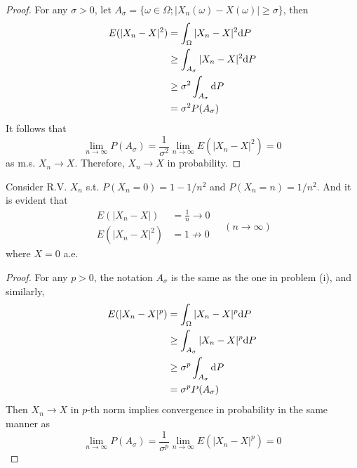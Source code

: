\documentclass{homework}
\begin{document}
    \problem
    \begin{subproblem}
        \item
        \begin{proof}
            For any $\sigma>0$, let
            $A_\sigma=\{\omega\in\Omega;|X_n(\omega)-X(\omega)|\geq\sigma\}$,
            then
            \[\begin{aligned}
                E(|X_n-X|^2)&=\int_\Omega|X_n-X|^2\mathrm d P\\
                &\geq\int_{A_\sigma}|X_n-X|^2\mathrm d P\\
                &\geq \sigma^2\int_{A_\sigma}\mathrm d P\\
                &=\sigma^2P(A_\sigma)
            \end{aligned}\]
            It follows that
            \[\lim_{n\to\infty}P(A_\sigma)
            =\frac{1}{\sigma^2}\lim_{n\to\infty}E(|X_n-X|^2)
            =0\]
            as m.s. $X_n\to X$. Therefore, $X_n\to X$ in probability.
        \end{proof}

        \item
        Consider R.V. $X_n$ s.t. $P(X_n=0)=1-1/n^2$ and $P(X_n=n)=1/n^2$.
        And it is evident that
        \[\begin{aligned}
            E(|X_n-X|)&=\frac{1}{n}\to 0\\
            E(|X_n-X|^2)&=1\not\to 0
        \end{aligned}\quad(n\to\infty)\]
        where $X=0$ a.e.

        \item
        \begin{proof}
            For any $p>0$, the notation $A_\sigma$ is the same
            as the one in problem (i), and similarly,
            \[\begin{aligned}
                E(|X_n-X|^p)&=\int_\Omega|X_n-X|^p\mathrm d P\\
                &\geq\int_{A_\sigma}|X_n-X|^p\mathrm d P\\
                &\geq \sigma^p\int_{A_\sigma}\mathrm d P\\
                &=\sigma^pP(A_\sigma)
            \end{aligned}\]
            Then $X_n\to X$ in $p$-th norm implies convergence in
            probability in the same manner as
            \[\lim_{n\to\infty}P(A_\sigma)
            =\frac{1}{\sigma^p}\lim_{n\to\infty}E(|X_n-X|^p)
            =0\]
        \end{proof}
    \end{subproblem}
\end{document}
